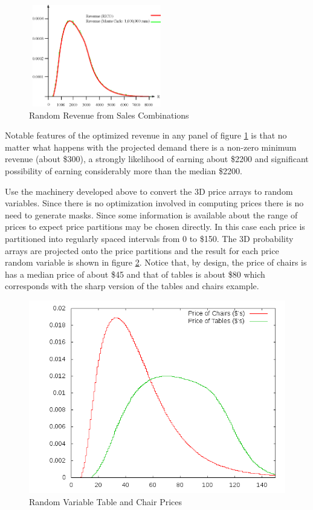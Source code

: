 \begin{figure}[ht]
\begin{minipage}[b]{0.5\linewidth}
\centering
\includegraphics[width=2.33in, height=1.75in]{Images/ABC_1M}
\end{minipage}
  \caption[Random Revenue from Sales Combinations]
          {Random Revenue from Sales Combinations}
  \label{fig:ABC_4}
\end{figure}



Notable features of the optimized revenue in any panel of figure \ref{fig:ABC_4} is that no matter what happens with the projected demand there is a non-zero minimum revenue (about \$300), a strongly likelihood of earning about \$2200 and significant possibility of earning considerably more than the median \$2200.

Use the machinery developed above to convert the 3D price arrays to random variables. Since there is no optimization involved in computing prices there is no need to generate masks. Since some information is available about the range of prices to expect price partitions may be chosen directly. In this case each price is partitioned into regularly spaced intervals from 0 to \$150. The 3D probability arrays are projected onto the price partitions and the result for each price random variable is shown in figure \ref{fig:tcd_prices}. Notice that, by design, the price of chairs is has a median price of about \$45 and that of tables is about \$80 which corresponds with the sharp version of the tables and chairs example. 

\begin{figure}
  \centering
  \includegraphics[width=120mm]{Images/tcd_prices}
  \caption[Random Variable Table and Chair Prices]
          {Random Variable Table and Chair Prices}
  \label{fig:tcd_prices}
\end{figure}

